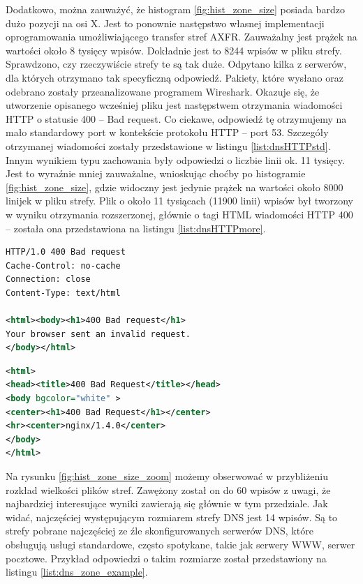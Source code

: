 Dodatkowo, można zauważyć, że histogram \ref{fig:hist_zone_size} posiada bardzo dużo pozycji na osi X. Jest to ponownie następstwo
własnej implementacji oprogramowania umożliwiającego transfer stref AXFR. Zauważalny jest prążek na wartości około 8 tysięcy
wpisów. Dokładnie jest to 8244 wpisów w pliku strefy. Sprawdzono, czy rzeczywiście strefy te są tak duże. Odpytano kilka z serwerów,
dla których otrzymano tak specyficzną odpowiedź. Pakiety, które wysłano oraz odebrano zostały przeanalizowane programem Wireshark.
Okazuje się, że utworzenie opisanego wcześniej pliku jest następstwem otrzymania wiadomości HTTP o statusie 400 -- Bad request.
Co ciekawe, odpowiedź tę otrzymujemy na mało standardowy port w kontekście protokołu HTTP -- port 53. Szczegóły otrzymanej wiadomości
zostały przedstawione w listingu \ref{list:dnsHTTPstd}. Innym wynikiem typu zachowania były odpowiedzi o liczbie linii ok. 11 tysięcy.
Jest to wyraźnie mniej zauważalne, wnioskując choćby po histogramie \ref{fig:hist_zone_size}, gdzie widoczny jest jedynie prążek na
wartości około 8000 linijek w pliku strefy. Plik o około 11 tysiącach (11900 linii) wpisów był tworzony w wyniku otrzymania rozszerzonej,
głównie o tagi HTML wiadomości HTTP 400 -- została ona przedstawiona na listingu \ref{list:dnsHTTPmore}.

\begin{lstlisting}[label={list:dnsHTTPstd},captionpos=b,caption=Odpowiedź HTTP 400 na zapytanie DNS.,language=xml]
HTTP/1.0 400 Bad request
Cache-Control: no-cache
Connection: close
Content-Type: text/html

<html><body><h1>400 Bad request</h1>
Your browser sent an invalid request.
</body></html>
\end{lstlisting}

\begin{lstlisting}[label={list:dnsHTTPmore},captionpos=b,caption=Rozszerzona odpowiedź HTTP 400 na zapytanie DNS.,language=xml]
<html>
<head><title>400 Bad Request</title></head>
<body bgcolor="white" >
<center><h1>400 Bad Request</h1></center>
<hr><center>nginx/1.4.0</center>
</body>
</html>
\end{lstlisting}

Na rysunku \ref{fig:hist_zone_size_zoom} możemy obserwować w przybliżeniu rozkład wielkości plików stref. Zawężony został on do 60
wpisów z uwagi, że najbardziej interesujące wyniki zawierają się głównie w tym przedziale. Jak widać, najczęściej występującym
rozmiarem strefy DNS jest 14 wpisów. Są to strefy pobrane najczęściej ze źle skonfigurowanych serwerów DNS, które obsługują usługi
standardowe, często spotykane, takie jak serwery WWW, serwer pocztowe. Przykład odpowiedzi o takim rozmiarze został przedstawiony na
listingu \ref{list:dns_zone_example}.

